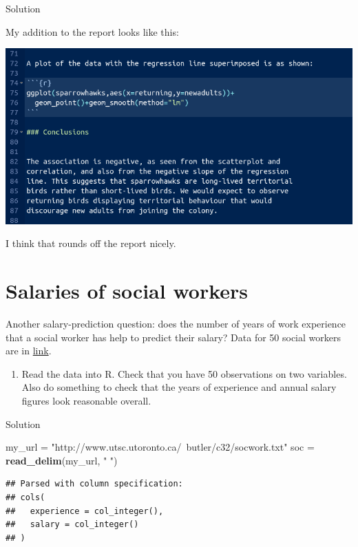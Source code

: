 \documentclass[]{tufte-book}
\newenvironment{Shaded}{}{}
\newcommand{\KeywordTok}[1]{\textcolor[rgb]{0.00,0.44,0.13}{\textbf{#1}}}
\newcommand{\NormalTok}[1]{#1}
\newcommand{\StringTok}[1]{\textcolor[rgb]{0.25,0.44,0.63}{#1}}
\providecommand{\tightlist}{%
  \setlength{\itemsep}{0pt}\setlength{\parskip}{0pt}}
\theoremstyle{definition}
\theoremstyle{definition}
\theoremstyle{definition}
\theoremstyle{remark}
\begin{document}
Solution

My addition to the report looks like this:

\includegraphics{sh7.png}

I think that rounds off the report nicely.

\hypertarget{salaries-of-social-workers}{%
\section{Salaries of social workers}\label{salaries-of-social-workers}}

Another salary-prediction question: does the number of years of work
experience that a social worker has help to predict their salary? Data
for 50 social workers are in
\href{http://www.utsc.utoronto.ca/~butler/c32/socwork.txt}{link}.

\begin{enumerate}
\def\labelenumi{(\alph{enumi})}
\tightlist
\item
  Read the data into R. Check that you have 50 observations on two
  variables. Also do something to check that the years of experience and
  annual salary figures look reasonable overall.
\end{enumerate}

Solution

\begin{Shaded}
\begin{Highlighting}[]
\NormalTok{my_url =}\StringTok{ "http://www.utsc.utoronto.ca/~butler/c32/socwork.txt"}
\NormalTok{soc =}\StringTok{ }\KeywordTok{read_delim}\NormalTok{(my_url, }\StringTok{" "}\NormalTok{)}
\end{Highlighting}
\end{Shaded}

\begin{verbatim}
## Parsed with column specification:
## cols(
##   experience = col_integer(),
##   salary = col_integer()
## )
\end{verbatim}
\end{document}
